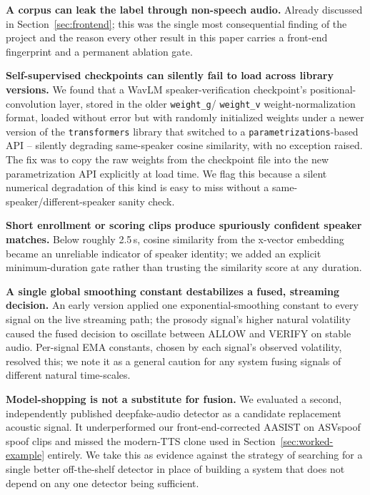 \documentclass[conference]{IEEEtran}
\begin{document}
\textbf{A corpus can leak the label through non-speech audio.} Already
discussed in Section~\ref{sec:frontend}; this was the single most
consequential finding of the project and the reason every other result
in this paper carries a front-end fingerprint and a permanent ablation
gate.

\textbf{Self-supervised checkpoints can silently fail to load across
library versions.} We found that a WavLM speaker-verification checkpoint's
positional-convolution layer, stored in the older \texttt{weight\_g}/
\texttt{weight\_v} weight-normalization format, loaded without error but
with randomly initialized weights under a newer version of the
\texttt{transformers} library that switched to a \texttt{parametrizations}-based
API -- silently degrading same-speaker cosine similarity, with no
exception raised. The fix was to copy the raw weights from the
checkpoint file into the new parametrization API explicitly at load
time. We flag this because a silent numerical degradation of this kind
is easy to miss without a same-speaker/different-speaker sanity check.

\textbf{Short enrollment or scoring clips produce spuriously confident
speaker matches.} Below roughly 2.5\,s, cosine similarity from the
x-vector embedding became an unreliable indicator of speaker identity;
we added an explicit minimum-duration gate rather than trusting the
similarity score at any duration.

\textbf{A single global smoothing constant destabilizes a fused,
streaming decision.} An early version applied one exponential-smoothing
constant to every signal on the live streaming path; the prosody
signal's higher natural volatility caused the fused decision to
oscillate between ALLOW and VERIFY on stable audio. Per-signal EMA
constants, chosen by each signal's observed volatility, resolved this;
we note it as a general caution for any system fusing signals of
different natural time-scales.

\textbf{Model-shopping is not a substitute for fusion.} We evaluated a
second, independently published deepfake-audio detector as a candidate
replacement acoustic signal. It underperformed our front-end-corrected
AASIST on ASVspoof spoof clips and missed the modern-TTS clone used in
Section~\ref{sec:worked-example} entirely. We take this as evidence
against the strategy of searching for a single better off-the-shelf
detector in place of building a system that does not depend on any one
detector being sufficient.
\end{document}
